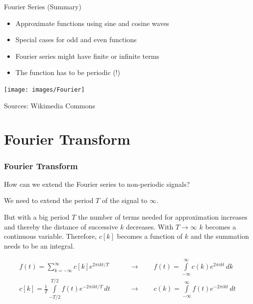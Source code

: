 \begin{frame}[t]{Fourier Series (Summary)}
    \begin{itemize}
        \item Approximate functions using sine and cosine waves
        \item Special cases for odd and even functions
        \item Fourier series might have finite or infinite terms
        \item The function has to be periodic (!)
    \end{itemize}

    \begin{flushright}

        \texttt{[image: images/Fourier]}

        \scriptsize Sources: Wikimedia Commons
    \end{flushright}
\end{frame}



\section{Fourier Transform}%
\label{sec:fourier_transform}



\begin{frame}
    \frametitle{Fourier Transform}
    \question How can we extend the Fourier series to non-periodic signals?\newline

    \answer We need to extend the period $T$ of the signal to $\infty$.\newline

    But with a big period $T$ the number of terms needed for approximation increases and thereby the distance of successive $k$ decreases. With $T\rightarrow\infty$ $k$ becomes a continuous variable. Therefore, $c[k]$ becomes a function of $k$ and the summation needs to be an integral.

        {
            \begin{align*}
                f(t) = \sum\limits_{k=-\infty}^{\infty} c[k] e^{2\pi ikt/T} \quad\quad            & \rightarrow \quad\quad f(t) = \int\limits_{-\infty}^{\infty} c(k) e^{2\pi ikt}\, dk  \\
                c[k] = \frac{1}{T}\int\limits_{-T/2}^{T/2} f(t) e^{-2\pi ikt/T}\, dt \quad\quad & \rightarrow \quad\quad c(k) = \int\limits_{-\infty}^{\infty} f(t) e^{-2\pi ikt}\, dt
            \end{align*}
        }
\end{frame}



